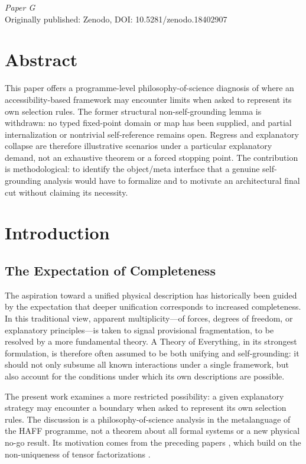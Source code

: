 \documentclass[12pt,a4paper,openany]{book}
\begin{document}
\begin{center}
\textit{Paper G}\\[0.5em]
Originally published: Zenodo, DOI: 10.5281/zenodo.18402907
\end{center}

\bigskip

\section*{Abstract}
This paper offers a programme-level philosophy-of-science diagnosis of where an accessibility-based framework may encounter limits when asked to represent its own selection rules. The former structural non-self-grounding lemma is withdrawn: no typed fixed-point domain or map has been supplied, and partial internalization or nontrivial self-reference remains open. Regress and explanatory collapse are therefore illustrative scenarios under a particular explanatory demand, not an exhaustive theorem or a forced stopping point. The contribution is methodological: to identify the object/meta interface that a genuine self-grounding analysis would have to formalize and to motivate an architectural final cut without claiming its necessity.


\section{Introduction}
\label{G-sec:intro}

\subsection{The Expectation of Completeness}

The aspiration toward a unified physical description has historically been guided by the expectation that deeper unification corresponds to increased completeness. In this traditional view, apparent multiplicity---of forces, degrees of freedom, or explanatory principles---is taken to signal provisional fragmentation, to be resolved by a more fundamental theory. A Theory of Everything, in its strongest formulation, is therefore often assumed to be both unifying and self-grounding: it should not only subsume all known interactions under a single framework, but also account for the conditions under which its own descriptions are possible.

The present work examines a more restricted possibility: a given explanatory strategy may encounter a boundary when asked to represent its own selection rules.  The discussion is a philosophy-of-science analysis in the metalanguage of the HAFF programme, not a theorem about all formal systems or a new physical no-go result.  Its motivation comes from the preceding papers \cite{Liu2026PaperA,Liu2026PaperB,Liu2026PaperC,Liu2026PaperD,Liu2026PaperE,Liu2026PaperF}, which build on the non-uniqueness of tensor factorizations \cite{Zanardi2001,Zanardi2004}.
\end{document}
